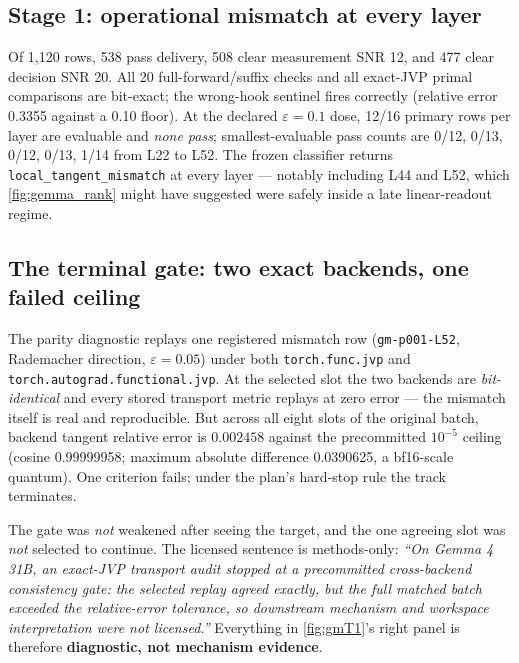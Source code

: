 \documentclass[11pt]{article}
\newcommand{\eps}{\varepsilon}
\theoremstyle{definition}
\theoremstyle{remark}
\begin{document}
\subsection{Stage 1: operational mismatch at every layer}
Of 1,120 rows, 538 pass delivery, 508 clear measurement SNR 12, and 477 clear
decision SNR 20. All 20 full-forward/suffix checks and all exact-JVP primal
comparisons are bit-exact; the wrong-hook sentinel fires correctly (relative
error 0.3355 against a 0.10 floor). At the declared $\eps = 0.1$ dose, 12/16
primary rows per layer are evaluable and \emph{none pass}; smallest-evaluable
pass counts are 0/12, 0/13, 0/12, 0/13, 1/14 from L22 to L52. The frozen
classifier returns \texttt{local\_tangent\_mismatch} at every layer ---
notably including L44 and L52, which \cref{fig:gemma_rank} might have
suggested were safely inside a late linear-readout regime.

\subsection{The terminal gate: two exact backends, one failed ceiling}
The parity diagnostic replays one registered mismatch row
(\texttt{gm-p001-L52}, Rademacher direction, $\eps=0.05$) under both
\texttt{torch.func.jvp} and \texttt{torch.autograd.functional.jvp}. At the
selected slot the two backends are \emph{bit-identical} and every stored
transport metric replays at zero error --- the mismatch itself is real and
reproducible. But across all eight slots of the original batch, backend
tangent relative error is $0.002458$ against the precommitted $10^{-5}$
ceiling (cosine 0.99999958; maximum absolute difference 0.0390625, a
bf16-scale quantum). One criterion fails; under the plan's hard-stop rule the
track terminates.

\begin{warningbox}
The gate was \emph{not} weakened after seeing the target, and the one
agreeing slot was \emph{not} selected to continue. The licensed sentence is
methods-only: \emph{``On Gemma 4 31B, an exact-JVP transport audit stopped at
a precommitted cross-backend consistency gate: the selected replay agreed
exactly, but the full matched batch exceeded the relative-error tolerance, so
downstream mechanism and workspace interpretation were not licensed.''}
Everything in \cref{fig:gmT1}'s right panel is therefore
\textbf{diagnostic, not mechanism evidence}.
\end{warningbox}
\end{document}
